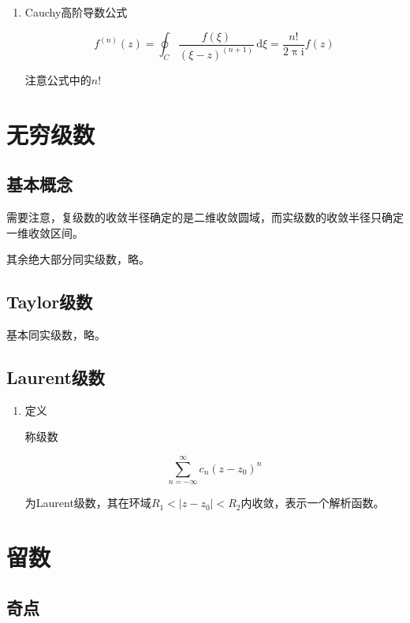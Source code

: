 \documentclass[UTF8,fontset=fandol,zihao=5]{ctexart}
\newcommand{\ii}{\mathrm{i}}
\newcommand{\dd}{\,\mathrm{d}}
\begin{document}
\begin{enumerate}
  \item Cauchy高阶导数公式
  
  \[
  f^{(n)}(z)=\oint_{C}\frac{f(\xi)}{\left(\xi-z\right)^(n+1)}\dd \xi
  =\frac{n!}{2\uppi\ii}f(z)
  \]

  \begin{methodbox}
    注意公式中的$n!$
  \end{methodbox}

\end{enumerate}

\section{无穷级数}

\subsection{基本概念}

需要注意，复级数的收敛半径确定的是二维收敛圆域，而实级数的收敛半径只确定一维收敛区间。

其余绝大部分同实级数，略。

\subsection{Taylor级数}

基本同实级数，略。

\subsection{Laurent级数}

\begin{enumerate}
  
  \item 定义
  
  称级数

  \[
  \sum_{n=-\infty}^{\infty} c_n (z-z_0)^n
  \]
  
  为Laurent级数，其在环域$R_1<|z-z_0|<R_2$内收敛，表示一个解析函数。

\end{enumerate}

\section{留数}

\subsection{奇点}
\end{document}
